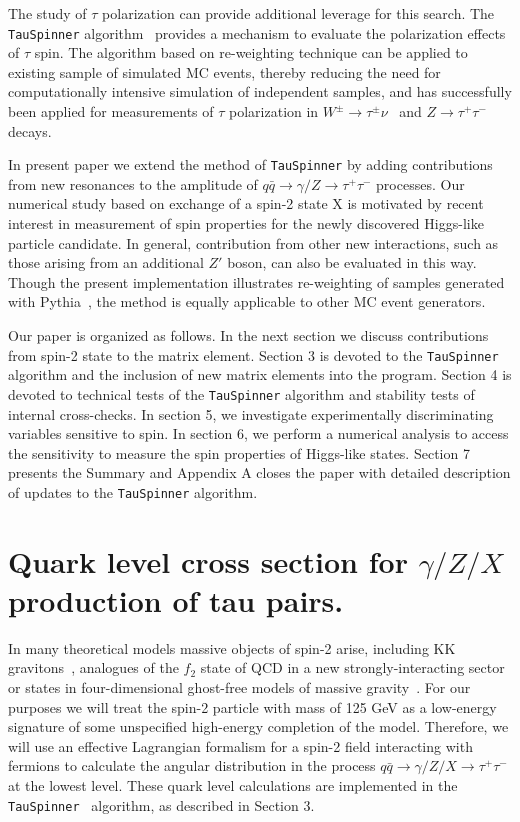 \documentclass[12pt]{article}
\begin{document}
The study of $\tau$ polarization can provide additional leverage for this search.
The  {\tt TauSpinner} algorithm~\cite{Czyczula:2012ny} provides a mechanism to evaluate the polarization effects of $\tau$ spin.
The algorithm based on re-weighting technique can be applied to existing sample of simulated MC events,
thereby reducing the need for computationally intensive simulation of independent samples,
and has successfully been applied for measurements of $\tau$ polarization in $W^\pm\to\tau^\pm\nu$~\cite{:2012cu}  and $Z\to\tau^+\tau^-$~\cite{Deigaard} decays.

In present paper we  extend the method of {\tt TauSpinner} by adding contributions 
from new resonances to the amplitude of $q \bar q \to \gamma/Z  \to \tau^+\tau^-$ processes. 
Our numerical study  based on exchange of a spin-2 state X is motivated by recent interest 
in measurement of spin properties for the newly discovered Higgs-like particle candidate.
In general, contribution from other new interactions, such as those arising from an additional $Z'$ boson, can also be evaluated in this way. 
Though the present implementation illustrates re-weighting of samples generated with Pythia~\cite{Sjostrand:2007gs}, 
the method is equally applicable to other MC event generators.

Our paper is organized as follows. In the next section we discuss contributions from spin-2 state to the matrix element.
Section 3 is devoted to the {\tt TauSpinner} algorithm and the inclusion of new matrix elements into the program.
Section 4 is devoted to technical tests of the {\tt TauSpinner} algorithm and stability tests of internal cross-checks.
In section 5, we investigate experimentally discriminating variables sensitive to spin.
In section 6, we perform a numerical analysis to access the sensitivity to measure the spin properties of Higgs-like states. 
Section 7 presents the Summary and Appendix A closes the paper with detailed description of updates to the  {\tt TauSpinner} algorithm.
 
\section {Quark level cross section for $\gamma/Z/X$ production of tau pairs. } \label{noSM}

In many theoretical models massive objects of spin-2 arise, including KK gravitons~\cite{ADD,RS}, 
analogues of the $f_2$ state of QCD in a new strongly-interacting sector~\cite{MP} or states in four-dimensional ghost-free models of massive gravity~\cite{RG}.
For our purposes we will treat the spin-2 particle with mass of 125 GeV as a low-energy signature of some unspecified high-energy completion of the model. 
Therefore, we will use an effective Lagrangian formalism  for a spin-2 field interacting with fermions 
to calculate the angular distribution in the process $q\bar q\to \gamma/Z/X\to\tau^+\tau^-$ at the lowest level.  
These quark level calculations are implemented in the {\tt TauSpinner}~\cite{Czyczula:2012ny} algorithm, as described in Section 3.
\end{document}
